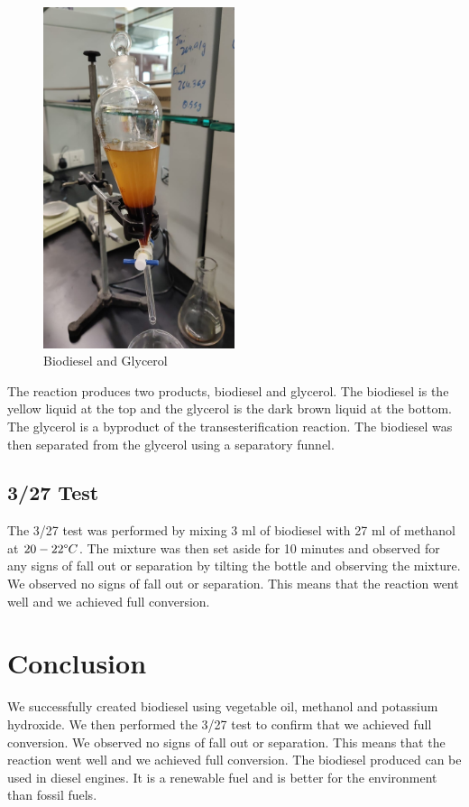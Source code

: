 \documentclass[a4paper, 12pt, english]{article}
\begin{document}
\begin{figure}[H]
	\centering
	\includegraphics[width=0.5\textwidth]{images/biodiesel.jpg}
	\caption{Biodiesel and Glycerol}
\end{figure}

The reaction produces two products, biodiesel and glycerol. The biodiesel is
the yellow liquid at the top and the glycerol is the dark brown liquid at the
bottom. The glycerol is a byproduct of the transesterification reaction. The
biodiesel was then separated from the glycerol using a separatory funnel.

\subsection{3/27 Test}
The 3/27 test was performed by mixing 3 ml of biodiesel with 27 ml of methanol
at $20-22\degree C$. The mixture was then set aside for 10 minutes and observed
for any signs of fall out or separation by tilting the bottle and observing the
mixture. We observed no signs of fall out or separation. This means that the
reaction went well and we achieved full conversion.

\section{Conclusion}
We successfully created biodiesel using vegetable oil, methanol and potassium
hydroxide. We then performed the 3/27 test to confirm that we achieved full
conversion. We observed no signs of fall out or separation. This means that the
reaction went well and we achieved full conversion. The biodiesel produced can
be used in diesel engines. It is a renewable fuel and is better for the
environment than fossil fuels.
\end{document}
